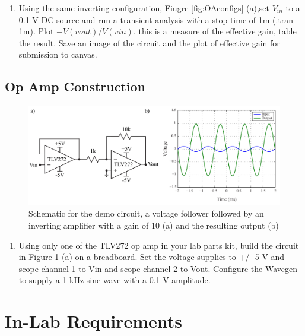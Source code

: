 \begin{enumerate}
	\item Using the same inverting configuration, \hyperref[fig:OAconfigs]{Fiugre \ref*{fig:OAconfigs} (a)},set $V_{in}$ to a 0.1 V DC source and run a transient analysis with a stop time of 1m (.tran 1m). Plot $-V(vout)/V(vin)$, this is a measure of the effective gain, table the result. Save an image of the circuit and the plot of effective gain for submission to canvas. \label{itm:5ssec1itm7}
\end{enumerate}

\subsection{Op Amp Construction} \label{ssec:opampcon}

\begin{figure} [h]
	\centering
		\includegraphics[width=1\textwidth]{Lab5demockt.pdf}
	\caption{Schematic for the demo circuit, a voltage follower followed by an inverting amplifier with a gain of 10 (a) and the resulting output (b)} \label{fig:5demockt}
\end{figure}

\begin{enumerate}
	\item Using only one of the TLV272 op amp in your lab parts kit, build the circuit in \hyperref[fig:5demockt]{Figure \ref*{fig:5demockt} (a)} on a breadboard. Set the voltage supplies to +/- 5 V and scope channel 1 to Vin and scope channel 2 to Vout. Configure the Wavegen to supply a 1 kHz sine wave with a 0.1 V amplitude. 
\end{enumerate}

\section{In-Lab Requirements}

